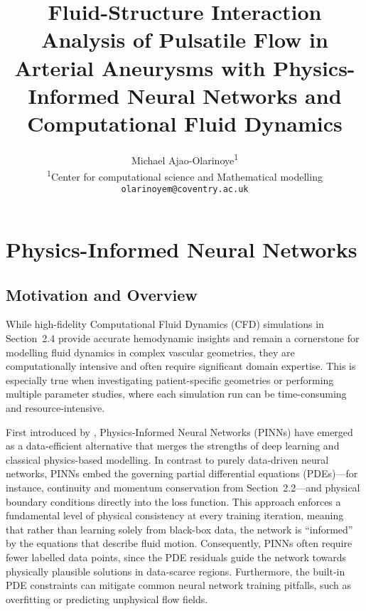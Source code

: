 \documentclass[12pt, a4paper]{article}
\title{
    \vspace{-2cm} %
    \large \textbf{Fluid-Structure Interaction Analysis of Pulsatile Flow in Arterial Aneurysms with Physics-Informed Neural Networks and Computational Fluid Dynamics}\\
}
\author{
    Michael Ajao-Olarinoye\textsuperscript{1} \\
    \textsuperscript{1}Center for computational science and Mathematical modelling \\
    \texttt{olarinoyem@coventry.ac.uk}
}
\date{}
\begin{document}
\maketitle


\section{Physics-Informed Neural Networks}
\label{sec:PINNs}

\subsection{Motivation and Overview}
While high-fidelity Computational Fluid Dynamics (CFD) simulations in Section~2.4 provide accurate hemodynamic insights and remain a cornerstone for modelling fluid dynamics in complex vascular geometries, they are computationally intensive and often require significant domain expertise. This is especially true when investigating patient-specific geometries or performing multiple parameter studies, where each simulation run can be time-consuming and resource-intensive.

First introduced by \citet{raissi2019physics}, Physics-Informed Neural Networks (PINNs) have emerged as a data-efficient alternative that merges the strengths of deep learning and classical physics-based modelling. In contrast to purely data-driven neural networks, PINNs embed the governing partial differential equations (PDEs)—for instance, continuity and momentum conservation from Section~2.2—and physical boundary conditions directly into the loss function. This approach enforces a fundamental level of physical consistency at every training iteration, meaning that rather than learning solely from black-box data, the network is ``informed'' by the equations that describe fluid motion. Consequently, PINNs often require fewer labelled data points, since the PDE residuals guide the network towards physically plausible solutions in data-scarce regions. Furthermore, the built-in PDE constraints can mitigate common neural network training pitfalls, such as overfitting or predicting unphysical flow fields.
\end{document}
